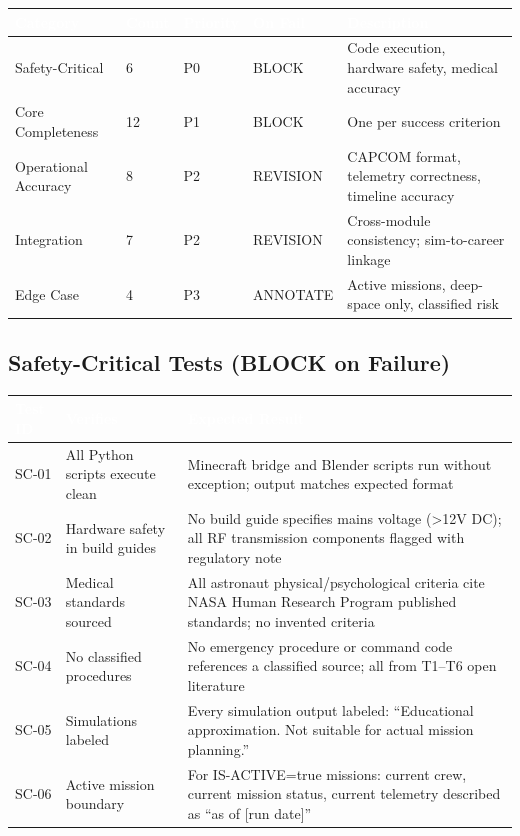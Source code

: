 \documentclass[11pt,letterpaper]{article}
\newcommand{\tableheader}[1]{\textbf{\sffamily\textcolor{white}{#1}}}
\begin{document}
\begin{center}
\begin{tabularx}{\textwidth}{L{3cm}C{1.5cm}C{1.5cm}L{2cm}X}
\toprule
{}
\tableheader{Category} & \tableheader{Count} & \tableheader{Priority} & \tableheader{On Fail} & \tableheader{Description} \\
\midrule
Safety-Critical & 6 & P0 & BLOCK & Code execution, hardware safety, medical accuracy \\
Core Completeness & 12 & P1 & BLOCK & One per success criterion \\
Operational Accuracy & 8 & P2 & REVISION & CAPCOM format, telemetry correctness, timeline accuracy \\
Integration & 7 & P2 & REVISION & Cross-module consistency; sim-to-career linkage \\
Edge Case & 4 & P3 & ANNOTATE & Active missions, deep-space only, classified risk \\
\bottomrule
\end{tabularx}
\end{center}

\subsection{Safety-Critical Tests (BLOCK on Failure)}

\begin{center}
\begin{tabularx}{\textwidth}{L{1.5cm}L{3.5cm}X}
\toprule
{}
\tableheader{Test ID} & \tableheader{Verifies} & \tableheader{Expected Result} \\
\midrule
SC-01 & All Python scripts execute clean & Minecraft bridge and Blender scripts run without exception; output matches expected format \\
SC-02 & Hardware safety in build guides & No build guide specifies mains voltage (\textgreater{}12V DC); all RF transmission components flagged with regulatory note \\
SC-03 & Medical standards sourced & All astronaut physical/psychological criteria cite NASA Human Research Program published standards; no invented criteria \\
SC-04 & No classified procedures & No emergency procedure or command code references a classified source; all from T1--T6 open literature \\
SC-05 & Simulations labeled & Every simulation output labeled: ``Educational approximation. Not suitable for actual mission planning.'' \\
SC-06 & Active mission boundary & For IS-ACTIVE=true missions: current crew, current mission status, current telemetry described as ``as of [run date]'' \\
\bottomrule
\end{tabularx}
\end{center}
\end{document}
